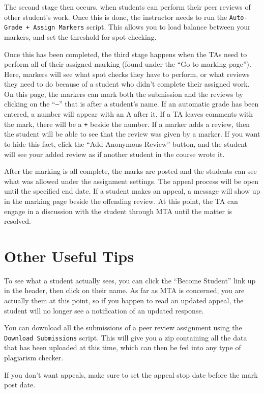 \documentclass[11pt,letterpaper,oneside]{article}
\begin{document}
The second stage then occurs,  when students can perform their peer reviews of other student's work. Once this is done,  the instructor needs to run the \texttt{Auto-Grade + Assign Markers} script. This allows you to load balance between your markers,  and set the threshold for spot checking. 

Once this has been completed,  the third stage happens when the TAs need to perform all of their assigned marking (found under the ``Go to marking page''). Here,  markers will see what spot checks they have to perform, or what reviews they need to do because of a student who didn't complete their assigned work. On this page,  the markers can mark both the submission and the reviews by clicking on the ``\texttt{--}'' that is after a student's name. If an automatic grade has been entered,  a number will appear with an A after it. If a TA leaves comments with the mark,  there will be a \texttt{+} beside the number. If a marker adds a review,  then the student will be able to see that the review was given by a marker. If you want to hide this fact,  click the ``Add Anonymous Review'' button,  and the student will see your added review as if another student in the course wrote it.

After the marking is all complete,  the marks are posted and the students can see what was allowed under the assignment settings. The appeal process will be open until the specified end date. If a student makes an appeal,  a message will show up in the marking page beside the offending review. At this point,  the TA can engage in a discussion with the student through MTA until the matter is resolved.

\section{Other Useful Tips}

To see what a student actually sees,  you can click the ``Become Student'' link up in the header,  then click on their name. As far as MTA is concerned, you are actually them at this point, so if you happen to read an updated appeal,  the student will no longer see a notification of an updated response.

You can download all the submissions of a peer review assignment using the \texttt{Download Submissions} script. This will give you a zip containing all the data that has been uploaded at this time,  which can then be fed into any type of plagiarism checker.

If you don't want appeals,  make sure to set the appeal stop date before the mark post date.
\end{document}
